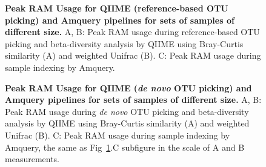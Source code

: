 \documentclass[10pt,letterpaper]{article}
\begin{document}
\begin{figure}[!h]
\caption{{\bf Peak RAM Usage for QIIME (reference-based OTU picking) and Amquery pipelines for sets of samples of different size.}
A, B: Peak RAM usage during reference-based OTU picking and beta-diversity analysis by QIIME using Bray-Curtis similarity (A) and weighted Unifrac (B). 
C: Peak RAM usage during sample indexing by Amquery.}
\label{fig3}
\end{figure}

\begin{figure}[!h]
\caption{{\bf Peak RAM Usage for QIIME (\textit{de novo} OTU picking) and Amquery pipelines for sets of samples of different size.}
A, B: Peak RAM usage during \textit{de novo} OTU picking and beta-diversity analysis by QIIME using Bray-Curtis similarity (A) and weighted Unifrac (B). 
C: Peak RAM usage during sample indexing by Amquery, the same as Fig~\ref{fig3}.C subfigure in the scale of A and B measurements.}
\label{fig4}
\end{figure}
\end{document}
